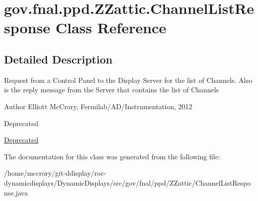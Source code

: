 \hypertarget{classgov_1_1fnal_1_1ppd_1_1ZZattic_1_1ChannelListResponse}{\section{gov.\-fnal.\-ppd.\-Z\-Zattic.\-Channel\-List\-Response Class Reference}
\label{classgov_1_1fnal_1_1ppd_1_1ZZattic_1_1ChannelListResponse}
}


\subsection{Detailed Description}
Request from a Control Panel to the Display Server for the list of Channels. Also is the reply message from the Server that contains the list of Channels

\begin{DoxyAuthor}{Author}
Elliott Mc\-Crory, Fermilab/\-A\-D/\-Instrumentation, 2012 
\end{DoxyAuthor}
\begin{DoxyRefDesc}{Deprecated}
\item[\hyperlink{deprecated__deprecated000007}{Deprecated}]\end{DoxyRefDesc}


The documentation for this class was generated from the following file\-:\begin{DoxyCompactItemize}
\item 
/home/mccrory/git-\/ddisplay/roc-\/dynamicdisplays/\-Dynamic\-Displays/src/gov/fnal/ppd/\-Z\-Zattic/Channel\-List\-Response.\-java\end{DoxyCompactItemize}
